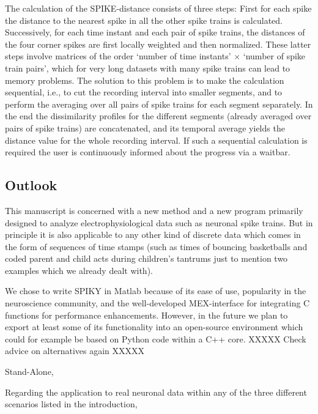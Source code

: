 \documentclass[10pt,twocolumn]{elsart5p}
\begin{document}
The calculation of the SPIKE-distance consists of three steps: First for each spike the distance to the nearest spike in all the other spike trains is calculated. Successively, for each time instant and each pair of spike trains, the distances of the four corner spikes are first locally weighted and then normalized. These latter steps involve matrices of the order `number of time instants' $\times$ `number of spike train pairs', which for very long datasets with many spike trains can lead to memory problems. The solution to this problem is to make the calculation sequential, i.e., to cut the recording interval into smaller segments, and to perform the averaging over all pairs of spike trains for each segment separately. In the end the dissimilarity profiles for the different segments (already averaged over pairs of spike trains) are concatenated, and its temporal average yields the distance value for the whole recording interval. If such a sequential calculation is required the user is continuously informed about the progress via a waitbar.



\subsection{\label{ss:Outlook} Outlook}

This manuscript is concerned with a new method and a new program primarily designed to analyze electrophysiological data such as neuronal spike trains. But in principle it is also applicable to any other kind of discrete data which comes in the form of sequences of time stamps (such as times of bouncing basketballs and coded parent and child acts during children's tantrums just to mention two examples which we already dealt with).

We chose to write SPIKY in Matlab because of its ease of use, popularity in the neuroscience community, and the well-developed MEX-interface for integrating C functions for performance enhancements. However, in the future we plan to export at least some of its functionality into an open-source environment which could for example be based on Python code within a C++ core. XXXXX Check advice on alternatives again XXXXX

Stand-Alone, 

%

Regarding the application to real neuronal data within any of the three different scenarios listed in the introduction,
\end{document}
